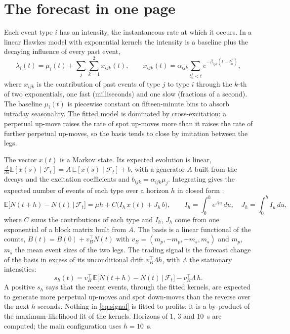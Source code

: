 \documentclass[a4paper,11pt]{article}
\begin{document}
\section{The forecast in one page}

Each event type $i$ has an intensity, the instantaneous rate at which it occurs. In a linear Hawkes model with exponential kernels the intensity is a baseline plus the decaying influence of every past event,
\[
\lambda_i(t) = \mu_i(t) + \sum_{j}\sum_{k=1}^{2} x_{ijk}(t), \qquad
x_{ijk}(t) = \alpha_{ijk} \sum_{t^j_n < t} e^{-\beta_{ijk}(t - t^j_n)},
\]
where $x_{ijk}$ is the contribution of past events of type $j$ to type $i$ through the $k$-th of two exponentials, one fast (milliseconds) and one slow (fractions of a second). The baseline $\mu_i(t)$ is piecewise constant on fifteen-minute bins to absorb intraday seasonality. The fitted model is dominated by cross-excitation: a perpetual up-move raises the rate of spot up-moves more than it raises the rate of further perpetual up-moves, so the basis tends to close by imitation between the legs.

The vector $x(t)$ is a Markov state. Its expected evolution is linear, $\frac{d}{ds}\mathbb{E}[x(s)\mid\mathcal{F}_t] = A\,\mathbb{E}[x(s)\mid\mathcal{F}_t] + b$, with a generator $A$ built from the decays and the excitation coefficients and $b_{ijk} = \alpha_{ijk}\mu_j$. Integrating gives the expected number of events of each type over a horizon $h$ in closed form \cite{bacry2015}:
\begin{equation}\label{eq:forecast}
\mathbb{E}\big[N(t+h) - N(t) \,\big|\, \mathcal{F}_t\big] = \mu h + C\big(I_h\, x(t) + J_h\, b\big),
\qquad I_h = \int_0^h e^{Au}\,du, \quad J_h = \int_0^h I_u\,du,
\end{equation}
where $C$ sums the contributions of each type and $I_h$, $J_h$ come from one exponential of a block matrix built from $A$. The basis is a linear functional of the counts, $B(t) = B(0) + v_B^\top N(t)$ with $v_B = (m_p, -m_p, -m_s, m_s)$ and $m_p$, $m_s$ the mean event sizes of the two legs. The trading signal is the forecast change of the basis in excess of its unconditional drift $v_B^\top \Lambda h$, with $\Lambda$ the stationary intensities:
\begin{equation}\label{eq:signal}
s_h(t) = v_B^\top\, \mathbb{E}\big[N(t+h) - N(t) \,\big|\, \mathcal{F}_t\big] - v_B^\top \Lambda\, h .
\end{equation}
A positive $s_h$ says that the recent events, through the fitted kernels, are expected to generate more perpetual up-moves and spot down-moves than the reverse over the next $h$ seconds. Nothing in \eqref{eq:signal} is fitted to profits: it is a by-product of the maximum-likelihood fit of the kernels. Horizons of $1$, $3$ and $10$~s are computed; the main configuration uses $h = 10$~s.
\end{document}
